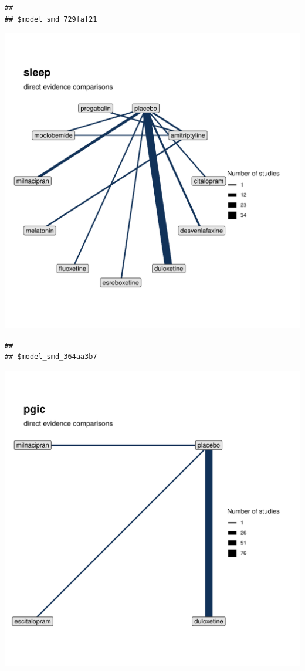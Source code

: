\documentclass{article}\usepackage[]{graphicx}\usepackage[]{color}
\makeatletter
\newenvironment{kframe}{%
 \def\at@end@of@kframe{}%
 \ifinner\ifhmode%
  \def\at@end@of@kframe{\end{minipage}}%
  \begin{minipage}{\columnwidth}%
 \fi\fi%
 \def\FrameCommand##1{\hskip\@totalleftmargin \hskip-\fboxsep
 \colorbox{shadecolor}{##1}\hskip-\fboxsep
     \hskip-\linewidth \hskip-\@totalleftmargin \hskip\columnwidth}%
 \MakeFramed {\advance\hsize-\width
   \@totalleftmargin\z@ \linewidth\hsize
   \@setminipage}}%
 {\par\unskip\endMakeFramed%
 \at@end@of@kframe}
\newenvironment{knitrout}{}{} %
\makeatother
\begin{document}
\begin{knitrout}
\begin{kframe}\begin{verbatim}
## 
## $model_smd_729faf21
\end{verbatim}
\end{kframe}
\includegraphics[width=\textwidth]{figure/networks-4} 
\begin{kframe}\begin{verbatim}
## 
## $model_smd_364aa3b7
\end{verbatim}
\end{kframe}
\includegraphics[width=\textwidth]{figure/networks-5} 

\end{knitrout}
\end{document}

